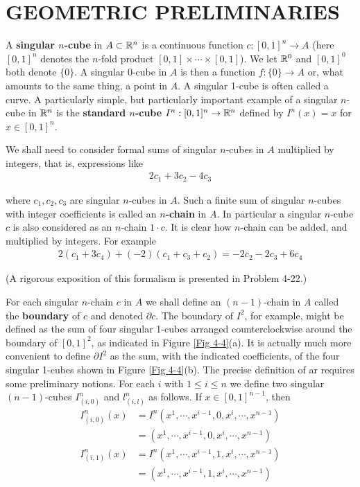 \clearpage
\section{GEOMETRIC PRELIMINARIES}
A \textbf{singular $n$-cube} in $A\subset \mathbb{R}^n$ is a continuous function 
$c:[0,1]^n\to A$ (here $[0,1]^n$ denotes the $n$-fold product $[0, 1]\times\cdots\times[0,1]$).
We let $\mathbb{R}^0$ and $[0,1]^0$ both denote $\{0\}$. A singular
0-cube in $A$ is then a function $f:\{0\}\to A$ or, what amounts to
the same thing, a point in $A$. A singular 1-cube is often
called a curve. A particularly simple, but particularly
important example of a singular $n$-cube in $\mathbb{R}^n$ is the \textbf{standard $n$-cube} 
$I^n:[0,1]^n\to\mathbb{R}^n$ defined by $I^n(x) = x$ for $x\in[0,1]^n$.

We shall need to consider formal sums of singular $n$-cubes in
$A$ multiplied by integers, that is, expressions like
\begin{align*}
    2c_1 + 3c_2 - 4c_3
\end{align*}

where $c_1,c_2,c_3$ are singular $n$-cubes in $A$. Such a finite sum of singular 
$n$-cubes with integer coefficients is called an \textbf{$n$-chain} in $A$. In particular 
a singular $n$-cube $c$ is also considered as an $n$-chain $1\cdot c$. It is clear how 
$n$-chain can be added, and multiplied by integers. For example 
\begin{align*}
    2(c_1+3c_4) + (-2)(c_1+c_3+c_2) = - 2c_2 - 2c_3 + 6c_4
\end{align*}

(A rigorous exposition of this formalism is presented in Problem 4-22.)

For each singular $n$-chain $c$ in $A$ we shall define an $(n-1)$-chain in $A$ called the \textbf{boundary} 
of $c$ and denoted $\partial c$. The boundary of $I^2$, for example, might be defined as the sum of
four singular 1-cubes arranged counterclockwise around the boundary of $[0,1]^2$, as indicated in 
Figure \ref{Fig 4-4}(a). It is actually much more convenient to define $\partial I^2$ as the sum, with
the indicated coefficients, of the four singular 1-cubes shown in Figure \ref{Fig 4-4}(b). The precise 
definition of ar requires some preliminary notions. For each $i$ with $1 \le i\le n$ we define
two singular $(n-1)$-cubes $I^n_{(i,0)}$ and $l^n_{(i,l)}$ as follows. If $x\in[0,1]^{n-1}$, then 
\begin{align*}
    I^n_{(i,0)}(x) 
    & = I^n(x^1,\cdots,x^{i-1},0,x^i,\cdots,x^{n-1}) \\
    & = (x^1,\cdots,x^{i-1},0,x^i,\cdots,x^{n-1})\\
    I^n_{(i,1)}(x)
    & = I^n(x^1,\cdots,x^{i-1},1,x^i,\cdots,x^{n-1}) \\
    & = (x^1,\cdots,x^{i-1},1,x^i,\cdots,x^{n-1})
\end{align*}

